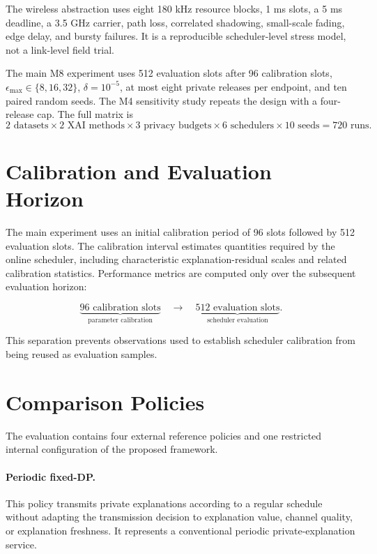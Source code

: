 \documentclass[11pt]{article}
\begin{document}
The wireless abstraction uses eight 180 kHz resource blocks, 1 ms slots, a 5 ms deadline, a 3.5 GHz carrier, path loss, correlated shadowing, small-scale fading, edge delay, and bursty failures. It is a reproducible scheduler-level stress model, not a link-level field trial.

The main M8 experiment uses 512 evaluation slots after 96 calibration slots, $\epsilon_{\max}\in\{8,16,32\}$, $\delta=10^{-5}$, at most eight private releases per endpoint, and ten paired random seeds. The M4 sensitivity study repeats the design with a four-release cap. The full matrix is
\[
2\text{ datasets}\times2\text{ XAI methods}\times3\text{ privacy budgets}\times6\text{ schedulers}\times10\text{ seeds}=720\text{ runs}.
\]

\section{Calibration and Evaluation Horizon}

The main experiment uses an initial calibration period of 96 slots followed by 512 evaluation slots. The calibration interval estimates quantities required by the online scheduler, including characteristic explanation-residual scales and related calibration statistics. Performance metrics are computed only over the subsequent evaluation horizon:

\[
\underbrace{96\text{ calibration slots}}_{\text{parameter calibration}}
\quad\longrightarrow\quad
\underbrace{512\text{ evaluation slots}}_{\text{scheduler evaluation}}.
\]

This separation prevents observations used to establish scheduler calibration from being reused as evaluation samples.

\section{Comparison Policies}

The evaluation contains four external reference policies and one restricted internal configuration of the proposed framework.

\paragraph{Periodic fixed-DP.}
This policy transmits private explanations according to a regular schedule without adapting the transmission decision to explanation value, channel quality, or explanation freshness. It represents a conventional periodic private-explanation service.
\end{document}
